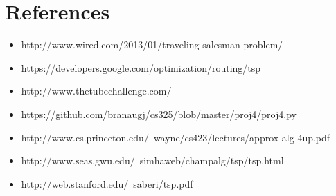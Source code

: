 \documentclass[11pt,letterpaper]{article}
\begin{document}
\section*{References}
\begin{itemize}
	\item http://www.wired.com/2013/01/traveling-salesman-problem/
	\item https://developers.google.com/optimization/routing/tsp
	\item http://www.thetubechallenge.com/
	\item https://github.com/branaugj/cs325/blob/master/proj4/proj4.py
	\item http://www.cs.princeton.edu/~wayne/cs423/lectures/approx-alg-4up.pdf
	\item http://www.seas.gwu.edu/~simhaweb/champalg/tsp/tsp.html
	\item http://web.stanford.edu/~saberi/tsp.pdf
\end{itemize}
\end{document}
